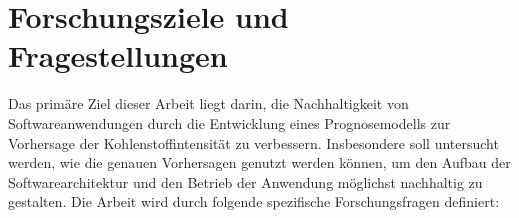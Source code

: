 %


\section{Forschungsziele und Fragestellungen}
Das primäre Ziel dieser Arbeit liegt darin, die Nachhaltigkeit von Softwareanwendungen durch die Entwicklung eines Prognosemodells zur Vorhersage der Kohlenstoffintensität zu verbessern.
Insbesondere soll untersucht werden, wie die genauen Vorhersagen genutzt werden können, um den Aufbau der Softwarearchitektur und den Betrieb der Anwendung möglichst nachhaltig zu gestalten.
Die Arbeit wird durch folgende spezifische Forschungsfragen definiert:


